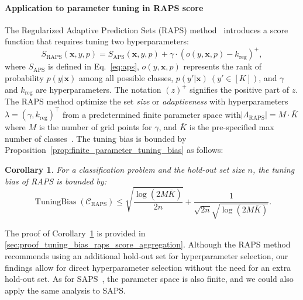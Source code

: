 \documentclass{article}
\newcommand{\1}{\mathbbm{1}}
\newcommand{\Eqref}[1]{Eq.~\eqref{#1}}
\newcommand{\TuningBias}{\mathop{\text{TuningBias}}}
\theoremstyle{plain}
\newtheorem{corollary}[theorem]{Corollary}
\theoremstyle{definition}
\theoremstyle{remark}
\begin{document}
\paragraph{Application to parameter tuning in RAPS score} The Regularized Adaptive Prediction Sets (RAPS) method~\citep{angelopoulos2021uncertainty} introduces a score function that requires tuning two hyperparameters:
\begin{equation*} \label{eq:raps}
S_{\text{RAPS}}(\boldsymbol{x}, y, p) = S_{\text{APS}}(\boldsymbol{x}, y, p) + \gamma \cdot (o(y, \boldsymbol{x}, p) - k_{\text{reg}})^+,
\end{equation*}
where \(S_{\text{APS}}\) is defined in \Eqref{eq:aps}, \(o(y, \boldsymbol{x}, p)\) represents the rank of probability \(p(y|\boldsymbol{x})\) among all possible classes, \(p(y'|\boldsymbol{x}) \ (y' \in [K])\), and  \(\gamma\) and \(k_{\text{reg}}\) are hyperparameters. 
The notation \((z)^+\) signifies the positive part of \(z\). 
The RAPS method optimize the set \textit{size} or \textit{adaptiveness} with hyperparameters \(\lambda = (\gamma, k_{\text{reg}})^\top\) from a predetermined finite parameter space with\(|\Lambda_{\text{RAPS}}| = M\cdot \bar{K}\) where \(M\) is the number of grid points for \(\gamma\), and \(\bar{K}\) is the pre-specified max number of classes~\citep{angelopoulos2021uncertainty}. 
The tuning bias is bounded by Proposition~\ref{prop:finite_parameter_tuning_bias} as follows:
\begin{corollary}
    \label{corollary:tuning_bias_raps}
    For a classification problem and the hold-out set size \(n\), the tuning bias of RAPS is bounded by:
    \begin{equation*}
        \TuningBias({\mathcal{C}}_{\text{RAPS}}) \leq \sqrt{\frac{\log(2M\bar{K})}{2n}} + \frac{1}{\sqrt{2n}\sqrt{\log(2M\bar{K})}}.
    \end{equation*}
\end{corollary}
The proof of Corollary~\ref{corollary:tuning_bias_raps} is provided in \cref{sec:proof_tuning_bias_raps_score_aggregation}.
Although the RAPS method~\citep{angelopoulos2021uncertainty} recommends using an additional hold-out set for hyperparameter selection, our findings allow for direct hyperparameter selection without the need for an extra hold-out set.
As for SAPS~\citep{huang2024conformal}, the parameter space is also finite, and we could also apply the same analysis to SAPS\@.
\end{document}
